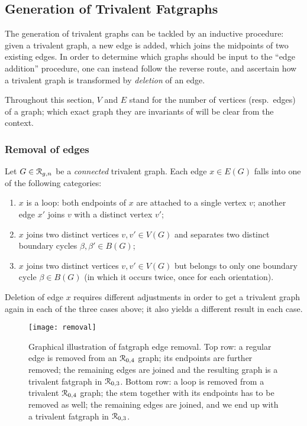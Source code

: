 \subsection{Generation of Trivalent Fatgraphs}
\label{sec:stage1-trivalent}

The generation of trivalent graphs can be tackled by an inductive
procedure: given a trivalent graph, a new edge is added, which joins
the midpoints of two existing edges.  
In order to determine which graphs should be input to the ``edge
addition'' procedure, one can instead follow the reverse route, and
ascertain how a trivalent graph is transformed by \emph{deletion} of
an edge.

Throughout this section, $V$ and $E$ stand for the number of vertices
(resp.~edges) of a graph; which exact graph they are invariants of
will be clear from the context.

\subsubsection{Removal of edges}
\label{sec:removal}

Let $G \in \mathcal{R}_{g,n}$ be a \emph{connected} trivalent graph. Each edge
$x \in E(G)$ falls into one of the following categories:
\begin{enumerate}[\sl A)]
\item $x$ is a loop: both endpoints of $x$ are
  attached to a single vertex $v$; another edge $x'$ joins $v$ with a
  distinct vertex $v'$;
\item $x$ joins two distinct vertices $v, v'
  \in V(G)$ and separates two distinct boundary cycles $\beta, \beta'
  \in B(G)$;
\item $x$ joins two distinct vertices $v, v'
  \in V(G)$ but belongs to only one boundary cycle $\beta \in B(G)$
  (in which it occurs twice, once for each orientation).
\end{enumerate}
Deletion of edge $x$ requires different adjustments in order to get a
trivalent graph again in each of the three cases above; it also yields
a different result in each case.
\begin{figure}
  \centering
  \texttt{[image: removal]}
  \caption{Graphical illustration of fatgraph edge removal.  Top row: a regular edge is removed from an $\mathcal{R}_{0,4}$ graph; its endpoints are further removed; the remaining edges are joined and the resulting graph is a trivalent fatgraph in $\mathcal{R}_{0,3}$.  Bottom row: a loop is removed from a trivalent $\mathcal{R}_{0,4}$ graph; the stem together with its endpoints has to be removed as well; the remaining edges are joined, and we end up with a trivalent fatgraph in $\mathcal{R}_{0,3}$.}
  \label{fig:removal}
\end{figure}

